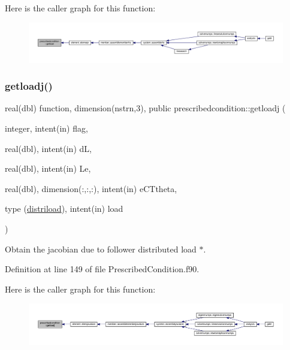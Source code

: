 Here is the caller graph for this function\+:\nopagebreak
\begin{figure}[H]
\begin{center}
\leavevmode
\includegraphics[width=350pt]{namespaceprescribedcondition_a6f624d814d4a2927fd9cc778231e6840_icgraph}
\end{center}
\end{figure}
\mbox{\label{namespaceprescribedcondition_aa1915c03ae6332a4fa577bcbc8ca2a68}} 
\subsubsection{\texorpdfstring{getloadj()}{getloadj()}}
{\footnotesize\ttfamily real(dbl) function, dimension(nstrn,3), public prescribedcondition\+::getloadj (\begin{DoxyParamCaption}\item[{integer, intent(in)}]{flag,  }\item[{real(dbl), intent(in)}]{dL,  }\item[{real(dbl), intent(in)}]{Le,  }\item[{real(dbl), dimension(\+:,\+:,\+:), intent(in)}]{e\+C\+Ttheta,  }\item[{type (\hyperlink{structprescribedcondition_1_1distriload}{distriload}), intent(in)}]{load }\end{DoxyParamCaption})}



Obtain the jacobian due to follower distributed load $\ast$. 



Definition at line 149 of file Prescribed\+Condition.\+f90.

Here is the caller graph for this function\+:\nopagebreak
\begin{figure}[H]
\begin{center}
\leavevmode
\includegraphics[width=350pt]{namespaceprescribedcondition_aa1915c03ae6332a4fa577bcbc8ca2a68_icgraph}
\end{center}
\end{figure}
\mbox{\label{namespaceprescribedcondition_a88f45dfc44f37db180ed595e112a2a36}} 
